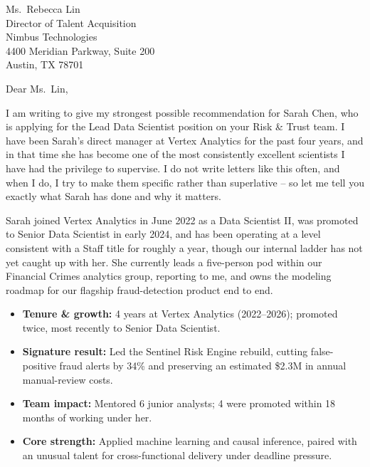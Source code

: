 \documentclass[11pt]{letter}
\begin{document}
\begin{letter}{Ms.\ Rebecca Lin\\ Director of Talent Acquisition\\ Nimbus Technologies\\ 4400 Meridian Parkway, Suite 200\\ Austin, TX 78701}

\opening{Dear Ms.\ Lin,}

I am writing to give my strongest possible recommendation for Sarah Chen, who is applying for the Lead Data Scientist position on your Risk \& Trust team. I have been Sarah's direct manager at Vertex Analytics for the past four years, and in that time she has become one of the most consistently excellent scientists I have had the privilege to supervise. I do not write letters like this often, and when I do, I try to make them specific rather than superlative -- so let me tell you exactly what Sarah has done and why it matters.

Sarah joined Vertex Analytics in June 2022 as a Data Scientist II, was promoted to Senior Data Scientist in early 2024, and has been operating at a level consistent with a Staff title for roughly a year, though our internal ladder has not yet caught up with her. She currently leads a five-person pod within our Financial Crimes analytics group, reporting to me, and owns the modeling roadmap for our flagship fraud-detection product end to end.

\begin{tcolorbox}[
  enhanced,
  colback=paleblue,
  colframe=navy,
  boxrule=0.8pt,
  arc=2mm,
  left=10pt,right=10pt,top=7pt,bottom=7pt,
  title={\textbf{At a Glance}},
  coltitle=white,
  colbacktitle=navy,
  fonttitle=\normalsize
]
\begin{itemize}[leftmargin=1.6em,itemsep=5pt,topsep=3pt,label={}]
\item[\faTrophy] \textbf{Tenure \& growth:} 4 years at Vertex Analytics (2022--2026); promoted twice, most recently to Senior Data Scientist.
\item[\faChartLine] \textbf{Signature result:} Led the Sentinel Risk Engine rebuild, cutting false-positive fraud alerts by 34\% and preserving an estimated \$2.3M in annual manual-review costs.
\item[\faUsers] \textbf{Team impact:} Mentored 6 junior analysts; 4 were promoted within 18 months of working under her.
\item[\faBullseye] \textbf{Core strength:} Applied machine learning and causal inference, paired with an unusual talent for cross-functional delivery under deadline pressure.
\end{itemize}
\end{tcolorbox}


\end{letter}
\end{document}
